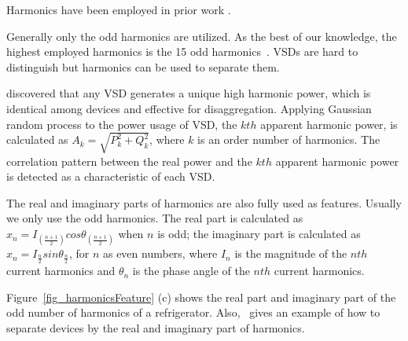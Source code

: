 Harmonics have been employed in prior work 
\cite{laughman2003power,lee2005estimation,srinivasan2006neural,akbar2007modified,matthews2008auto,wichakool2009modeling}.
\iffalse
\huijuanc{will be deleted until huijuan's next comments.}
Some paper mentioned $N_{highest}$ as 11
because that's the highest useful harmonic for disaggregation.
\manishc{why?}.
Other papers~\cite{srinivasan2006neural} set $N$ to be 16 in order to capture more harmonics information
\manishc{but the previous senstence says that 11 is the highest useful harmonic}.
\huijuanc{change above sentences as follows.}
\fi
Generally only the odd harmonics are utilized. 
As the best of our knowledge, the highest employed harmonics is the 15 odd harmonics~\cite{srinivasan2006neural}. 
VSDs are hard to distinguish
but harmonics can be used to separate them. 
\iffalse
\huijuanc{delete until next comments of huijuan}
\cite{lee2003PhdThesis,lee2005estimation} thoroughly explained the approaches
as estimating the mean of higher harmonics of apparent power, 
then correlating the apparent power with the fundamental harmonic powers, 
thus identifying the VSDs \manishc{it is hard to understand this sentence,
  what is fundamental powers?  please re-word}
  \huijuanc{paraphrases as follows.}
 \fi
  \cite{lee2003PhdThesis,lee2005estimation} discovered that any VSD generates 
  a unique high harmonic power, which is identical among devices and effective for disaggregation. 
  Applying Gaussian random process to the power usage of VSD, 
  the $kth$ apparent harmonic power, 
  is calculated as $A_k=\sqrt{P_k^2+Q_k^2}$, where $k$ is an order number of harmonics. 
The correlation pattern between the real power and 
the $kth$ apparent harmonic power is detected as a characteristic of each VSD. 

The real and imaginary parts of harmonics are also fully used as features. 
Usually we only use the odd harmonics. 
The real part is calculated as 
$x_n=I_{(\frac{n+1}{2})}cos\theta_{(\frac{n+1}{2})}$ when $n$ is odd; 
the imaginary part is calculated as 
$x_n=I_{\frac{n}{2}}sin\theta_{\frac{n}{2}}$, 
for $n$ as even numbers, 
where $I_n$ is the magnitude of the $nth$ current harmonics and
$\theta_n$ is the phase angle of the $nth$ current harmonics. 
\iffalse
\manishc{are these equations only for odd harmonics? i vaguely remember that
  only odd harmonics are interesting. could you verify that, and find out why
  it is so, and include it here.}
  \huijuanc{Yes. That's the reason the paper of Srinivasan only mentioned the odd number of harmonics here.}
\fi
Figure~\ref{fig_harmonicsFeature} (c) shows the real part and imaginary part 
of the odd number of harmonics of a refrigerator. 
Also,~\cite{srinivasan2006neural} gives an example of how to separate devices 
by the real and imaginary part of harmonics. 

